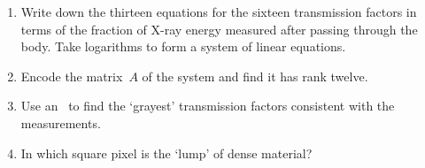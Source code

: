 \begin{exercise}
\setbox\ajrqrbox\hbox{}%
\marginpar{\usebox{\ajrqrbox\\[2ex]}}%
\begin{enumerate}
\item Write down the thirteen equations for the sixteen transmission factors in terms of the fraction of X-ray energy measured after passing through the body.
Take logarithms to form a system of linear equations.
\item Encode the matrix~\(A\) of the system and find it has rank twelve.
\item Use an \svd\ to find the `grayest' transmission factors consistent with the measurements.
\item In which square pixel is the `lump' of dense material?
\end{enumerate}
\end{exercise}










